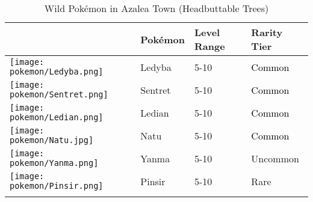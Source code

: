 \begin{longtable}{||l l l l||}%
\hline%
\rowcolor{GroundColor}%
&Pokémon&Level Range&Rarity Tier\\%
\hline%
\endhead%
\hline%
\rowcolor{GroundColor}%
\texttt{[image: pokemon/Ledyba.png]}&Ledyba&5{-}10&\textcolor{black}{%
Common%
}\\%
\hline%
\rowcolor{GroundColor}%
\texttt{[image: pokemon/Sentret.png]}&Sentret&5{-}10&\textcolor{black}{%
Common%
}\\%
\hline%
\rowcolor{GroundColor}%
\texttt{[image: pokemon/Ledian.png]}&Ledian&5{-}10&\textcolor{black}{%
Common%
}\\%
\hline%
\rowcolor{GroundColor}%
\texttt{[image: pokemon/Natu.jpg]}&Natu&5{-}10&\textcolor{black}{%
Common%
}\\%
\hline%
\rowcolor{GroundColor}%
\texttt{[image: pokemon/Yanma.png]}&Yanma&5{-}10&\textcolor{OliveGreen}{%
Uncommon%
}\\%
\hline%
\rowcolor{GroundColor}%
\texttt{[image: pokemon/Pinsir.png]}&Pinsir&5{-}10&\textcolor{RedOrange}{%
Rare%
}\\%
\hline%
\caption{Wild Pokémon in Azalea Town (Headbuttable Trees)}%
\label{tab:AzaleaTownHeadbuttableTrees}%
\end{longtable}